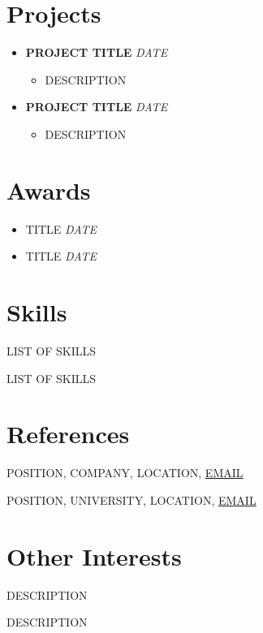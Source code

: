 \documentclass{article}
\begin{document}
\section{Projects}

\begin{itemize}
    \item \textbf{PROJECT TITLE} \hfill \emph{DATE}
\begin{itemize}
    \item DESCRIPTION
\end{itemize}
\end{itemize}

\begin{itemize}
    \item \textbf{PROJECT TITLE} \hfill \emph{DATE}
    \begin{itemize}
        \item DESCRIPTION
    \end{itemize}
\end{itemize}

\section{Awards}

\begin{itemize}
    \item TITLE \hfill \emph{DATE}
    \item TITLE \hfill \emph{DATE}
\end{itemize}
 
\section{Skills}

\begin{description}[widest=SKILL AREA]
    \item [SKILL AREA] LIST OF SKILLS
    \item [SKILL AREA] LIST OF SKILLS
\end{description}
 
\section{References}

\begin{description}[widest=NAME]
    \item[NAME] POSITION, COMPANY, LOCATION, \href{mailto:EMAIL}{EMAIL}
    \item[NAME] POSITION, UNIVERSITY, LOCATION, \href{mailto:EMAIL}{EMAIL}
\end{description}

\section{Other Interests}

\begin{description}[widest=INTEREST]
    \item[INTEREST] DESCRIPTION
    \item[INTEREST] DESCRIPTION
\end{description}
\end{document}
